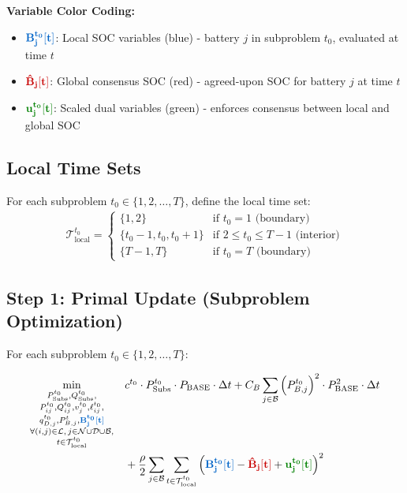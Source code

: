\documentclass[11pt]{article}
\newcommand{\blueB}[1]{\textcolor{bluevar}{\mathbf{#1}}}      %
\newcommand{\redBhat}[1]{\textcolor{redvar}{\mathbf{#1}}}     %
\newcommand{\greenu}[1]{\textcolor{greenvar}{\mathbf{#1}}}    %
\begin{document}
\textbf{Variable Color Coding:}
\begin{itemize}
    \item $\blueB{B_j^{t_0}[t]}$: Local SOC variables (blue) - battery $j$ in subproblem $t_0$, evaluated at time $t$
    \item $\redBhat{\hat{B}_j[t]}$: Global consensus SOC (red) - agreed-upon SOC for battery $j$ at time $t$
    \item $\greenu{u_j^{t_0}[t]}$: Scaled dual variables (green) - enforces consensus between local and global SOC
\end{itemize}

\subsection{Local Time Sets}

For each subproblem $t_0 \in \{1, 2, \ldots, T\}$, define the local time set:
\begin{align}
\mathcal{T}_{\text{local}}^{t_0} = \begin{cases}
\{1, 2\} & \text{if } t_0 = 1 \text{ (boundary)} \\
\{t_0-1, t_0, t_0+1\} & \text{if } 2 \leq t_0 \leq T-1 \text{ (interior)} \\
\{T-1, T\} & \text{if } t_0 = T \text{ (boundary)}
\end{cases}
\end{align}

\subsection{Step 1: Primal Update (Subproblem Optimization)}

For each subproblem $t_0 \in \{1, 2, \ldots, T\}$:

\begin{align}
\min_{\substack{P_{\text{Subs}}^{t_0}, Q_{\text{Subs}}^{t_0}, \\ P_{ij}^{t_0}, Q_{ij}^{t_0}, v_j^{t_0}, \ell_{ij}^{t_0}, \\ q_{D,j}^{t_0}, P_{B,j}^t, \blueB{B_j^{t_0}[t]} \\ \forall (i,j) \in \mathcal{L}, \, j \in \mathcal{N} \cup \mathcal{D} \cup \mathcal{B}, \\ t \in \mathcal{T}_{\text{local}}^{t_0}}} \quad & c^{t_0} \cdot P_{\text{Subs}}^{t_0} \cdot P_{\text{BASE}} \cdot \Delta t + C_B \sum_{j \in \mathcal{B}} \left(P_{B,j}^{t_0}\right)^2 \cdot P_{\text{BASE}}^2 \cdot \Delta t \notag \\
& + \frac{\rho}{2} \sum_{j \in \mathcal{B}} \sum_{t \in \mathcal{T}_{\text{local}}^{t_0}} \left( \blueB{B_j^{t_0}[t]} - \redBhat{\hat{B}_j[t]} + \greenu{u_j^{t_0}[t]} \right)^2 \label{eq:obj}
\end{align}
\end{document}
